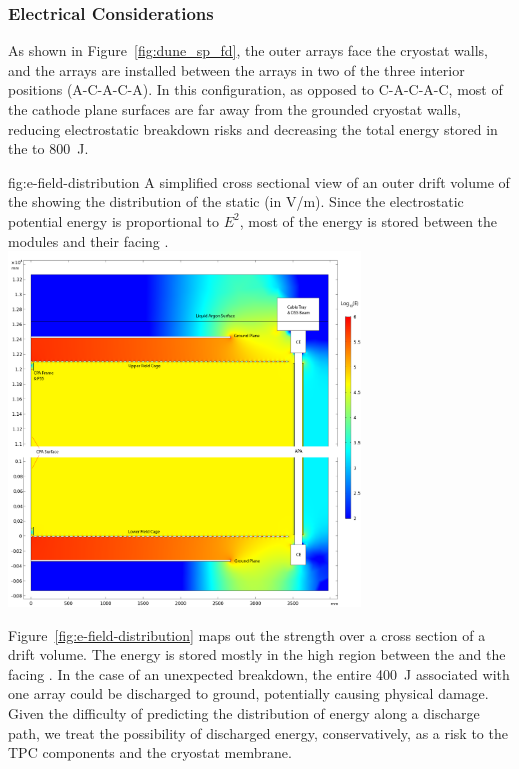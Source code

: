 \subsubsection{Electrical Considerations}
\label{sec:fdsp-hv-des-elec}

As shown in Figure~\ref{fig:dune_sp_fd}, the outer  arrays face the cryostat walls, and the  arrays are installed between the  arrays in two of the three interior positions (A-C-A-C-A).
In this configuration, as opposed to C-A-C-A-C,  most of the cathode plane surfaces are far away from the grounded cryostat walls, reducing electrostatic breakdown risks and decreasing the total energy stored in the \efield to \SI{800}{J}.

\begin{dunefigure}
{fig:e-field-distribution}
{A simplified cross sectional view of an outer drift volume of the  showing the distribution of the static \efield (in V/m).  Since the electrostatic potential energy is proportional to $E^2$, most of the energy is stored between the  modules and their facing .   }
\centering
\includegraphics[width=0.7\textwidth]{graphics/E_Field_Distribution.png} 
\end{dunefigure}

Figure~\ref{fig:e-field-distribution} maps out the \efield strength over a cross section of a drift volume.  
The energy is stored mostly in the high \efield{} region between the  and the facing .  In the case of an unexpected  breakdown, the entire \SI{400}{J} associated with one  array could be discharged to ground,
potentially causing physical damage.
Given the difficulty of predicting the distribution of energy along a discharge path, we treat the possibility of discharged energy, conservatively, as a risk to the TPC components and the cryostat membrane. 

